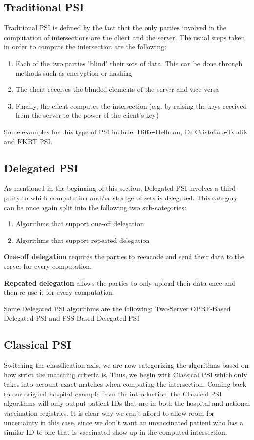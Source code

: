 \documentclass{article}
\begin{document}
\subsection{Traditional PSI}
Traditional PSI is defined by the fact that the only parties involved in the computation of intersections are the client and the server. 
The usual steps taken in order to compute the intersection are the following:
  \begin{enumerate}
    \item Each of the two parties "blind" their sets of data. This can be done through methods such as encryption or hashing
    \item The client receives the blinded elements of the server and vice versa
    \item Finally, the client computes the intersection (e.g. by raising the keys received from the server to the power of the client's key)
  \end{enumerate}

Some examples for this type of PSI include: Diffie-Hellman, De Cristofaro-Tsudik and KKRT PSI.


\subsection{Delegated PSI}
As mentioned in the beginning of this section, Delegated PSI involves a third party to which computation and/or storage of 
sets is delegated. This category can be once again split into the following two sub-categories:
\begin{enumerate}
  \item Algorithms that support one-off delegation 
  \item Algorithms that support repeated delegation
\end{enumerate}

\textbf{One-off delegation} requires the parties to reencode and send their data to the server for every computation. 

\textbf{Repeated delegation} allows the parties to only upload their data once and then re-use it for every computation.
\vspace{1em} 

Some Delegated PSI algorithms are the following: Two-Server OPRF-Based Delegated PSI and FSS-Based Delegated PSI
\subsection{Classical PSI}
Switching the classification axis, we are now categorizing the algorithms based on how strict the matching criteria is. Thus,
we begin with Classical PSI which only takes into account exact matches when computing the intersection. Coming back to our original
hospital example from the introduction, the Classical PSI algorithms will only output patient IDs that are in both the hospital and
national vaccination registries. It is clear why we can't afford to allow room for uncertainty in this case, since we don't want an unvaccinated patient
who has a similar ID to one that is vaccinated show up in the computed intersection.
\end{document}
